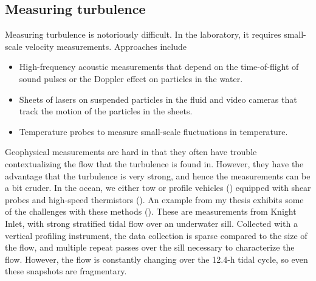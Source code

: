 \documentclass[11pt]{article}
\begin{document}
\subsection{Measuring turbulence}

Measuring turbulence is notoriously difficult. In the laboratory, it requires small-scale velocity measurements.  Approaches include 
\begin{itemize}
  \item High-frequency acoustic  measurements that depend on the time-of-flight of sound pulses or the Doppler effect on particles in the water. 
  \item Sheets of lasers on suspended particles in the fluid and video cameras that track the motion of the particles in the sheets.  
  \item Temperature probes to measure small-scale fluctuations in temperature.  
\end{itemize}

Geophysical measurements are hard in that they often have trouble contextualizing the flow that the turbulence is found in.  However, they have the advantage that the turbulence is very strong, and hence the measurements can be a bit cruder.  In the ocean, we either tow or profile vehicles () equipped with shear probes and high-speed thermistors ().  An example from my thesis exhibits some of the challenges with these methods ().  These are measurements from Knight Inlet, with strong stratified tidal flow over an underwater sill.  Collected with a vertical profiling instrument, the data collection is sparse compared to the size of the flow, and multiple repeat passes over the sill necessary to characterize the flow.  However, the flow is constantly changing over the 12.4-h tidal cycle, so even these snapshots are fragmentary.  
\end{document}
